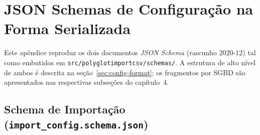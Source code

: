 \chapter{JSON Schemas de Configuração na Forma Serializada}
\label{ap:schemas}

Este apêndice reproduz os dois documentos \textit{JSON Schema} (rascunho 2020-12) tal
como embutidos em \texttt{src/polyglotimportcsv/schemas/}. A estrutura de alto nível
de ambos é descrita na seção~\ref{sec:config-format}; os fragmentos por SGBD são
apresentados nas respectivas subseções do capítulo~4.

\section{Schema de Importação (\texttt{import\_config.schema.json})}

